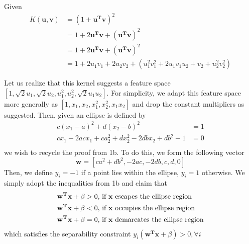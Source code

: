 \documentclass{article}
\begin{document}
Given
\begin{align*}
  K(\mathbf{u},\mathbf{v}) &= (1 + \mathbf{u^Tv})^2\\
  &= 1+2\mathbf{u^Tv}+(\mathbf{u^Tv})^2\\
  &= 1+2\mathbf{u^Tv}+(\mathbf{u^Tv})^2\\
  &= 1+2u_1v_1+2u_2v_2+(u_1^2v_1^2+2u_1v_1u_2+v_2 + u_2^2v_2^2)
\end{align*}

Let us realize that this kernel suggests a feature space
\([1, \sqrt{2}u_1, \sqrt{2}u_2, u_1^2, u_2^2, \sqrt{2}u_1u_2]\). For simplicity,
we adapt this feature space more generally as \([1, x_1, x_2, x_1^2, x_2^2, x_1x_2]\)
and drop the constant multipliers as suggested. Then, given an ellipse is defined by
\begin{align*}
  c(x_1-a)^2 + d(x_2-b)^2  &= 1\\
  cx_1-2acx_1 + ca_2^2 + dx_2^2 - 2dbx_2 + db^2 - 1 &= 0\\
\end{align*}
we wish to recycle the proof from 1b. To do this, we form the following vector
\begin{equation*}
  \mathbf{w} = [ca^2+db^2, -2ac, -2db, c, d, 0]
\end{equation*}
Then, we define \(y_i = -1 \) if a point lies within the ellipse, \(y_i = 1 \) otherwise.
We simply adopt the inequalities from 1b and claim that
\begin{align*}
  \mathbf{w^{T}x}+\beta & >0\textnormal{, if }\mathbf{x}\textnormal{ escapes the ellipse region}\\
  \mathbf{w^{T}x}+\beta & <0\textnormal{, if }\mathbf{x}\textnormal{ occupies the ellipse region}\\
  \mathbf{w^{T}x}+\beta & =0\textnormal{, if }\mathbf{x}\textnormal{ demarcates the ellipse region}
\end{align*}
which satisfies the separability constraint \(y_{i}(\mathbf{w^{T}x}+\beta)>0,\forall i\)
\end{document}
